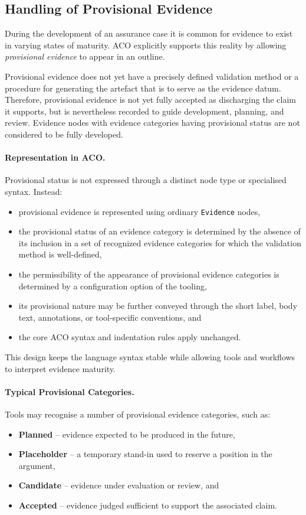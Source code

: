 \documentclass[11pt,twoside,a4paper]{article}
\begin{document}
\subsection{Handling of Provisional Evidence}
\label{sec:provisional-evidence}

During the development of an assurance case it is common for evidence to exist in
varying states of maturity. ACO explicitly supports this reality by allowing
\emph{provisional evidence} to appear in an outline.

Provisional evidence does not yet have a precisely defined validation method or a procedure for generating the artefact that is to serve as the evidence datum.
Therefore, provisional evidence is not yet fully accepted as discharging
the claim it supports, but is nevertheless recorded to guide development,
planning, and review. Evidence nodes with evidence categories having provisional status are not considered to be fully developed.

\paragraph{Representation in ACO.}
Provisional status is not expressed through a distinct node type or specialised
syntax. Instead:
\begin{itemize}[leftmargin=2em]
  \item provisional evidence is represented using ordinary \texttt{Evidence} nodes,
  \item the provisional status of an evidence category is determined by the absence of its inclusion in a set of recognized evidence categories for which the validation method is well-defined,
  \item the permissibility of the appearance of provisional evidence categories is determined by a configuration option of the tooling,
  \item its provisional nature may be further conveyed through the short label, body text,
        annotations, or tool-specific conventions, and
  \item the core ACO syntax and indentation rules apply unchanged.
\end{itemize}

This design keeps the language syntax stable while allowing tools and workflows
to interpret evidence maturity.

\paragraph{Typical Provisional Categories.}
Tools may recognise a number of provisional evidence categories, such as:
\begin{itemize}[leftmargin=2em]
  \item \textbf{Planned} -- evidence expected to be produced in the future,
  \item \textbf{Placeholder} -- a temporary stand-in used to reserve a position in the argument,
  \item \textbf{Candidate} -- evidence under evaluation or review, and
  \item \textbf{Accepted} -- evidence judged sufficient to support the associated claim.
\end{itemize}
\end{document}
